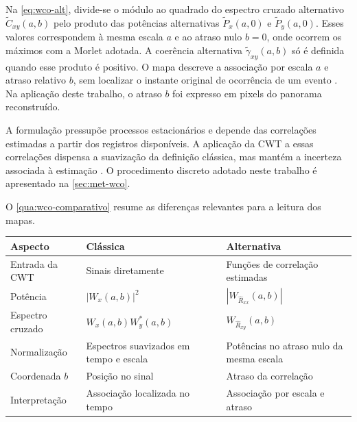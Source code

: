 Na \autoref{eq:wco-alt}, divide-se o módulo ao quadrado do espectro cruzado
alternativo $\widetilde C_{xy}(a,b)$ pelo produto das potências alternativas
$\widetilde P_x(a,0)$ e $\widetilde P_y(a,0)$. Esses valores correspondem à
mesma escala $a$ e ao atraso nulo $b=0$, onde ocorrem os máximos com a Morlet
adotada. A coerência alternativa $\widetilde\gamma_{xy}(a,b)$ só é definida
quando esse produto é positivo. O mapa descreve a associação por escala $a$
e atraso relativo $b$, sem localizar o instante original de ocorrência de
um evento \cite{schuck2019}. Na aplicação deste trabalho, o atraso $b$ foi
expresso em pixels do panorama reconstruído.

A formulação pressupõe processos estacionários e depende das correlações
estimadas a partir dos registros disponíveis. A aplicação da CWT a essas
correlações dispensa a suavização da definição clássica, mas mantém a
incerteza associada à estimação \cite{schuck2019}. O procedimento discreto
adotado neste trabalho é apresentado na \autoref{sec:met-wco}.

O \autoref{qua:wco-comparativo} resume as diferenças relevantes para a leitura
dos mapas.

\begin{quadro}[!htbp]
  \centering
  \begin{threeparttable}
  \caption[Comparação entre as formulações clássica e alternativa da coerência
  \textit{Wavelet}.]{Formulações clássica e alternativa da coerência
  \textit{Wavelet}, conforme ,
   e .}
  \label{qua:wco-comparativo}
  \begin{tabular}{p{3.1cm}p{5.1cm}p{5.1cm}}
    \hline
    \textbf{Aspecto} & \textbf{Clássica} & \textbf{Alternativa} \\
    \hline
    Entrada da CWT & Sinais diretamente & Funções de correlação estimadas \\
    Potência & $|W_x(a,b)|^2$ & $|W_{\widehat R_{xx}}(a,b)|$ \\
    Espectro cruzado & $W_x(a,b)W_y^*(a,b)$ & $W_{\widehat R_{xy}}(a,b)$ \\
    Normalização & Espectros suavizados em tempo e escala & Potências no atraso nulo da mesma escala \\
    Coordenada $b$ & Posição no sinal & Atraso da correlação \\
    Interpretação & Associação localizada no tempo & Associação por escala e atraso \\
    \hline
  \end{tabular}
  \end{threeparttable}
\end{quadro}

